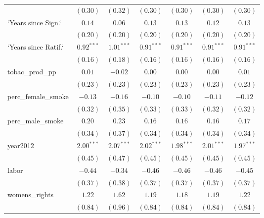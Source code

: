 \begin{table}[!h]
\begin{center}
\begin{tabular}{l c c c c c c }
                        & $(0.30)$     & $(0.32)$     & $(0.30)$     & $(0.30)$     & $(0.30)$     & $(0.30)$     \\
`Years since Sign.`     & $0.14$       & $0.06$       & $0.13$       & $0.13$       & $0.12$       & $0.13$       \\
                        & $(0.20)$     & $(0.20)$     & $(0.20)$     & $(0.20)$     & $(0.20)$     & $(0.20)$     \\
`Years since Ratif.`    & $0.92^{***}$ & $1.01^{***}$ & $0.91^{***}$ & $0.91^{***}$ & $0.91^{***}$ & $0.91^{***}$ \\
                        & $(0.16)$     & $(0.18)$     & $(0.16)$     & $(0.16)$     & $(0.16)$     & $(0.16)$     \\
tobac\_prod\_pp         & $0.01$       & $-0.02$      & $0.00$       & $0.00$       & $0.00$       & $0.01$       \\
                        & $(0.23)$     & $(0.23)$     & $(0.23)$     & $(0.23)$     & $(0.23)$     & $(0.23)$     \\
perc\_female\_smoke     & $-0.13$      & $-0.16$      & $-0.10$      & $-0.10$      & $-0.11$      & $-0.12$      \\
                        & $(0.32)$     & $(0.35)$     & $(0.33)$     & $(0.33)$     & $(0.32)$     & $(0.32)$     \\
perc\_male\_smoke       & $0.20$       & $0.23$       & $0.16$       & $0.16$       & $0.16$       & $0.17$       \\
                        & $(0.34)$     & $(0.37)$     & $(0.34)$     & $(0.34)$     & $(0.34)$     & $(0.34)$     \\
year2012                & $2.00^{***}$ & $2.07^{***}$ & $2.02^{***}$ & $1.98^{***}$ & $2.01^{***}$ & $1.97^{***}$ \\
                        & $(0.45)$     & $(0.47)$     & $(0.45)$     & $(0.45)$     & $(0.45)$     & $(0.45)$     \\
labor                   & $-0.44$      & $-0.34$      & $-0.46$      & $-0.46$      & $-0.46$      & $-0.45$      \\
                        & $(0.37)$     & $(0.38)$     & $(0.37)$     & $(0.37)$     & $(0.37)$     & $(0.37)$     \\
womens\_rights          & $1.22$       & $1.62$       & $1.19$       & $1.18$       & $1.19$       & $1.22$       \\
                        & $(0.84)$     & $(0.96)$     & $(0.84)$     & $(0.84)$     & $(0.84)$     & $(0.84)$     \\

\end{tabular}
\end{center}
\end{table}
